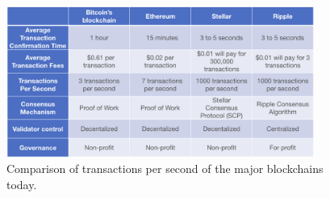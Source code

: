 \begin{figure}[t]
    \centering
    \includegraphics[width=0.90\textwidth]{tps_speed2.png}
  \caption{Comparison of transactions per second of the major blockchains today.}
    \label{fig:tps_speed}
\end{figure}

